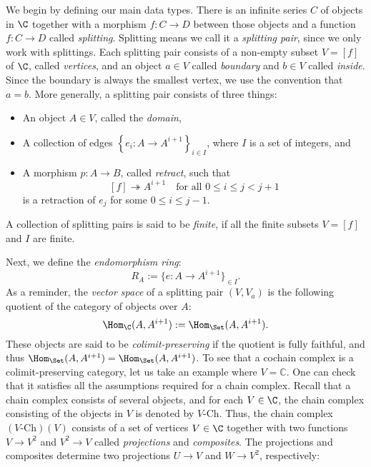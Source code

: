\documentclass[a4paper,reqno,oneside]{article}
\begin{document}
We begin by defining our main data types.  There is an infinite series $C$ of objects in $\C$ together with a morphism $f: C \to D$ between those objects and a function $f: C \rightarrow D$ called \textit{splitting}.  Splitting means we call it a \textit{splitting pair}, since we only work with splittings.  Each splitting pair consists of a non-empty subset $V = [f]$ of $\C$, called \textit{vertices}, and an object $a \in V$ called \textit{boundary} and $b \in V$ called \textit{inside}.  Since the boundary is always the smallest vertex, we use the convention that $a = b$.  More generally, a splitting pair consists of three things: 
\begin{itemize}
\item An object $A \in V$, called the \textit{domain},
\item A collection of edges $\left\{e_i: A \rightarrow A^{i+1}\right\}_{i \in I}$, where $I$ is a set of integers,
and
\item A morphism $p : A \rightarrow B$, called \textit{retract}, such that 
$$
[f] \twoheadrightarrow A^{i+1} \quad\text{for all } 0 \leq i \leq j < j + 1
$$
is a retraction of $e_j$ for some $0 \leq i \leq j - 1$.
\end{itemize}
\begin{definition}
    A collection of splitting pairs is said to be \textit{finite}, if all the finite subsets $V = [f]$ and $I$ are finite.
\end{definition}
Next, we define the \textit{endomorphism ring}:
$$
R_A := \{ e: A \rightarrow A^{i+1}\}_{\in I}.
$$
As a reminder, the \textit{vector space} of a splitting pair $(V, V_{a})$ is the following quotient of the category of objects over $A$:
$$
\Hom_\C(A, A^{i+1}):= \Hom_{\Set}(A, A^{i+1}).
$$
These objects are said to be \textit{colimit-preserving} if the quotient is fully faithful, and thus $\Hom_{\Set}(A, A^{i+1}) = \Hom_{\Set}(A, A^{i+1})$.
To see that a cochain complex is a colimit-preserving category, let us take an example where $V = \mathbb{C}$.  One can check that it satisfies all the assumptions required for a chain complex.  Recall that a chain complex consists of several objects, and for each $V \in \C$, the chain complex consisting of the objects in $V$ is denoted by $V\text{-}\mathrm{Ch}$.  Thus, the chain complex $(V\text{-}\mathrm{Ch})(V)$ consists of a set of vertices $V \in \C$ together with two functions $V \rightarrow V^{2}$ and $V^{2} \rightarrow V$ called \textit{projections} and \textit{composites}.  The projections and composites determine two projections $U \rightarrow V$ and $W \rightarrow V^{2}$, respectively:
\end{document}
